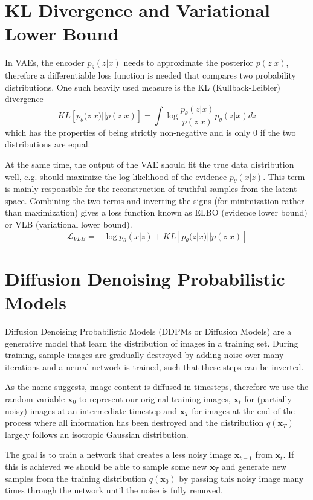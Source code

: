 \section{KL Divergence and Variational Lower Bound}
In VAEs, the encoder $p_{\theta}(z|x)$ needs to approximate the posterior $p(z|x)$, therefore a differentiable loss function is needed that compares two probability distributions. One such heavily used measure is the KL (Kullback-Leibler) divergence
\begin{equation}
    KL\left[p_{\theta}(z|x) || p(z|x)\right] = \int \log \frac{p_{\theta}(z|x)}{p(z|x)} p_{\theta}(z|x) dz
\end{equation}
which has the properties of being strictly non-negative and is only 0 if the two distributions are equal.

At the same time, the output of the VAE should fit the true data distribution well, e.g. should maximize the log-likelihood of the evidence $p_{\theta}(x|z)$. This term is mainly responsible for the reconstruction of truthful samples from the latent space. Combining the two terms and inverting the signs (for minimization rather than maximization) gives a loss function known as ELBO (evidence lower bound) or VLB (variational lower bound).
\begin{equation}
    \label{eq:elbo}
    \mathcal{L}_{VLB} = - \log p_{\theta}(x|z) + KL\left[p_{\theta}(z|x) || p(z|x)\right]
\end{equation}

\section{Diffusion Denoising Probabilistic Models}
Diffusion Denoising Probabilistic Models (DDPMs or Diffusion Models) are a generative model that learn the distribution of images in a training set. During training, sample images are gradually destroyed by adding noise over many iterations and a neural network is trained, such that these steps can be inverted.

As the name suggests, image content is diffused in timesteps, therefore we use the random variable $\bm{x}_0$ to represent our original training images, $\bm{x}_t$ for (partially noisy) images at an intermediate timestep and $\bm{x}_T$ for images at the end of the process where all information has been destroyed and the distribution $q(\bm{x}_T)$ largely follows an isotropic Gaussian distribution.

The goal is to train a network that creates a less noisy image $\bm{x}_{t-1}$ from $\bm{x}_t$. If this is achieved we should be able to sample some new $\bm{x}_T$ and generate new samples from the training distribution $q(\bm{x}_0)$ by passing this noisy image many times through the network until the noise is fully removed.

